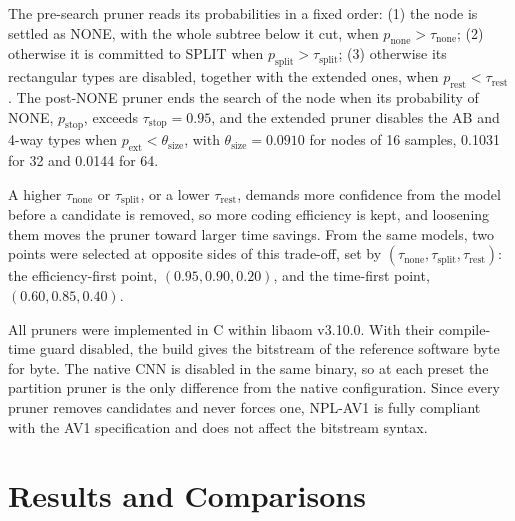 \documentclass[conference]{IEEEtran}
\begin{document}
The pre-search pruner reads its probabilities in a fixed order: (1) the node is
settled as NONE, with the whole subtree below it cut, when
$p_{\mathrm{none}} > \tau_{\mathrm{none}}$; (2) otherwise it is committed to SPLIT
when $p_{\mathrm{split}} > \tau_{\mathrm{split}}$; (3) otherwise its rectangular
types are disabled, together with the extended ones, when
$p_{\mathrm{rest}} < \tau_{\mathrm{rest}}$. The post-NONE pruner ends the search
of the node when its probability of NONE, $p_{\mathrm{stop}}$, exceeds
$\tau_{\mathrm{stop}} = 0.95$, and the extended pruner disables the AB and 4-way
types when $p_{\mathrm{ext}} < \theta_{\mathrm{size}}$, with
$\theta_{\mathrm{size}} = 0.0910$ for nodes of 16 samples, 0.1031 for 32 and
0.0144 for 64.

A higher $\tau_{\mathrm{none}}$ or $\tau_{\mathrm{split}}$, or a lower
$\tau_{\mathrm{rest}}$, demands more confidence from the model before a candidate
is removed, so more coding efficiency is kept, and loosening them moves the
pruner toward larger time savings. From the same models, two points were
selected at opposite sides of this trade-off, set by
$(\tau_{\mathrm{none}}, \tau_{\mathrm{split}}, \tau_{\mathrm{rest}})$: the
efficiency-first point, $(0.95, 0.90, 0.20)$, and the time-first point,
$(0.60, 0.85, 0.40)$.

All pruners were implemented in C within libaom v3.10.0. With their compile-time
guard disabled, the build gives the bitstream of the reference software byte for
byte. The native CNN is disabled in the same binary, so at each preset the
partition pruner is the only difference from the native configuration. Since
every pruner removes candidates and never forces one, NPL-AV1 is fully compliant
with the AV1 specification and does not affect the bitstream syntax.

\section{Results and Comparisons}
\label{sec_results}
\end{document}
